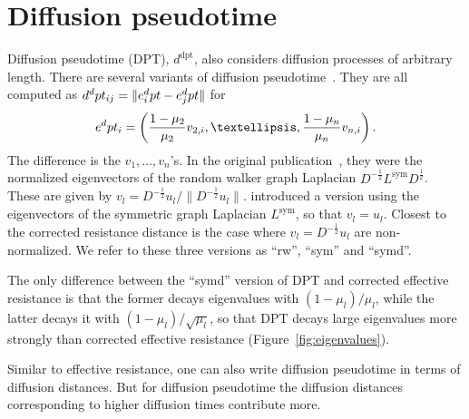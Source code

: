 \documentclass{article}
\newcommand{\lsym}{L^{\text{sym}}}
\theoremstyle{plain}
\theoremstyle{definition}
\theoremstyle{remark}
\begin{document}
\section{Diffusion pseudotime}
\label{app:dpt}

Diffusion pseudotime (DPT), $d^\text{dpt}$, \cite{haghverdi2016diffusion} also considers diffusion processes of arbitrary length. There are several variants of diffusion pseudotime~\cite{haghverdi2016diffusion, wolf2019paga}. They are all computed as  $ d^\textnormal{dpt}_{ij} = \| e_i^\textnormal{dpt} - e_j^\textnormal{dpt}\|$ for 
    \begin{align}
        e^\textnormal{dpt}_i = \left(\frac{1-\mu_2}{\mu_2} v_{2,i}, \dots,\frac{1-\mu_n}{\mu_n} v_{n,i} \right).
    \end{align}
The difference is the $v_1, \dots, v_n$'s. In the original publication~\citep{haghverdi2016diffusion}, they were the normalized eigenvectors of the random walker graph Laplacian $D^{-\frac{1}{2}}\lsym D^\frac{1}{2}$. These are given by $v_l = D^{-\frac{1}{2}}u_l  / \|D^{-\frac{1}{2}}u_l\|$. \citet{wolf2019paga} introduced a version using the eigenvectors of the symmetric graph Laplacian $\lsym$, so that $v_l= u_l$. Closest to the corrected resistance distance is the case where $v_l =D^{-\frac{1}{2}}u_l$ are non-normalized. We refer to these three versions as ``rw'', ``sym'' and ``symd''. 

The only difference between the ``symd'' version of DPT and corrected effective resistance is that the former decays eigenvalues with $(1-\mu_l)/\mu_l$, while the latter decays it with $(1-\mu_l)/\sqrt{\mu_l}$, so that DPT decays large eigenvalues more strongly than corrected effective resistance (Figure~\ref{fig:eigenvalues}). 


Similar to effective resistance, one can also write diffusion pseudotime in terms of diffusion distances. But for diffusion pseudotime the diffusion distances corresponding to higher diffusion times contribute more.
\end{document}
